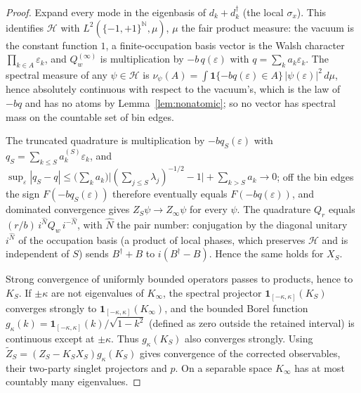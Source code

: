 \documentclass[11pt,a4paper]{article}
\newcommand{\Zt}{\widetilde Z}
\begin{document}
\begin{proof}
Expand every mode in the eigenbasis of $d_k+d_k^\dagger$ (the local $\sigma_x$). This identifies $\mathcal H$ with $L^2(\{-1,+1\}^{\mathbb N},\mu)$, $\mu$ the fair product measure: the vacuum is the constant function $1$, a finite-occupation basis vector is the Walsh character $\prod_{k\in A}\varepsilon_k$, and $Q_w^{(\infty)}$ is multiplication by $-b\,q(\varepsilon)$ with $q=\sum_ka_k\varepsilon_k$. The spectral measure of any $\psi\in\mathcal H$ is $\nu_\psi(A)=\int\mathbf 1\{-bq(\varepsilon)\in A\}\,|\psi(\varepsilon)|^2\,d\mu$, hence absolutely continuous with respect to the vacuum's, which is the law of $-bq$ and has no atoms by Lemma~\ref{lem:nonatomic}; so no vector has spectral mass on the countable set of bin edges. 

The truncated quadrature is multiplication by $-bq_S(\varepsilon)$ with $q_S=\sum_{k\le S}a^{(S)}_k\varepsilon_k$, and $\sup_\varepsilon|q_S-q|\le\big(\sum_ka_k\big)\big|(\sum_{j\le S}\lambda_j)^{-1/2}-1\big|+\sum_{k>S}a_k\to0$; off the bin edges the sign $F(-bq_S(\varepsilon))$ therefore eventually equals $F(-bq(\varepsilon))$, and dominated convergence gives $Z_S\psi\to Z_\infty\psi$ for every $\psi$. The quadrature $Q_r$ equals $(r/b)\,i^{\hat N}Q_w\,i^{-\hat N}$, with $\hat N$ the pair number: conjugation by the diagonal unitary $i^{\hat N}$ of the occupation basis (a product of local phases, which preserves $\mathcal H$ and is independent of $S$) sends $B^\dagger+B$ to $i(B^\dagger-B)$. Hence the same holds for $X_S$. 

Strong convergence of uniformly bounded operators passes to products, hence to $K_S$. If $\pm\kappa$ are not eigenvalues of $K_\infty$, the spectral projector $\mathbf 1_{[-\kappa,\kappa]}(K_S)$ converges strongly to $\mathbf 1_{[-\kappa,\kappa]}(K_\infty)$, and the bounded Borel function $g_\kappa(k)=\mathbf1_{[-\kappa,\kappa]}(k)/\sqrt{1-k^2}$ (defined as zero outside the retained interval) is continuous except at $\pm\kappa$. Thus $g_\kappa(K_S)$ also converges strongly. Using $\Zt_S=(Z_S-K_SX_S)g_\kappa(K_S)$ gives convergence of the corrected observables, their two-party singlet projectors and $p$. On a separable space $K_\infty$ has at most countably many eigenvalues.
\end{proof}
\end{document}
